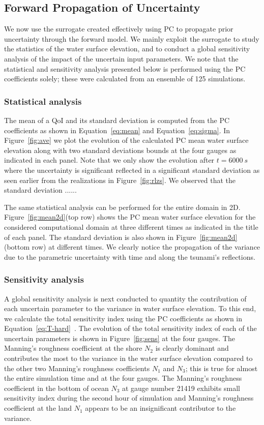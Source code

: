 \subsection{Forward Propagation of Uncertainty}
\label{sec:forward}
We now use the surrogate created effectively using PC to propagate prior 
uncertainty through the forward model. We mainly exploit the surrogate 
to study the statistics of the water surface elevation, and to conduct 
a global sensitivity analysis of the impact of the uncertain input parameters.
We note that the statistical and sensitivity analysis presented below 
is performed using the PC coefficients solely; these were calculated
from an ensemble of 125 \geoclaw simulations.
\subsubsection{Statistical analysis}
The mean of a QoI and its standard deviation is computed
from the PC coefficients as shown in Equation~\ref{eq:mean} and Equation~\ref{eq:sigma}. 
In Figure~\ref{fig:ave} we plot the evolution of
the calculated PC mean water surface elevation along with two standard deviations
bounds at the four gauges as indicated in each panel.  
Note that we only show the evolution after $t=6000~s$ where the uncertainty is significant
reflected in a significant standard deviation as seen earlier from the realizations in Figure~\ref{fig:rlzs}.
We observed that the standard deviation ...... 

The same statistical analysis can be performed for the
entire domain in 2D. Figure~\ref{fig:mean2d}(top row) shows
the PC mean water surface elevation for the considered computational
domain at three different times as indicated in the title of each panel.
The standard deviation is also shown in Figure~\ref{fig:mean2d}(bottom row)
at different times. We clearly notice the propagation of the variance
due to the parametric uncertainty with time
and along the tsunami's reflections. 

        
\subsubsection{Sensitivity analysis}
A global sensitivity analysis is next conducted to quantity the contribution of each
uncertain parameter to the variance in water surface elevation. To this end, we calculate 
the total sensitivity index using the PC coefficients as shown in Equation~\eqref{eq:T-hard}~\citep{Alexanderian2012,Sudret,Crestaux}. The evolution of the total sensitivity index
of each of the uncertain parameters is shown in Figure~\ref{fig:sens} at the four gauges. 
The Manning's roughness coefficient at the shore $N_2$ is clearly dominant and contributes
the most to the variance in the water surface elevation compared to the other two 
Manning's roughness coefficients $N_1$ and $N_3$; this is true for almost the entire simulation time
and at the four gauges. The Manning's roughness coefficient
in the bottom of ocean $N_{3}$ at gauge number 21419 exhibits small sensitivity index 
during the second hour of simulation and Manning's roughness coefficient
at the land $N_1$ appears to be an insignificant contributor
to the variance.

